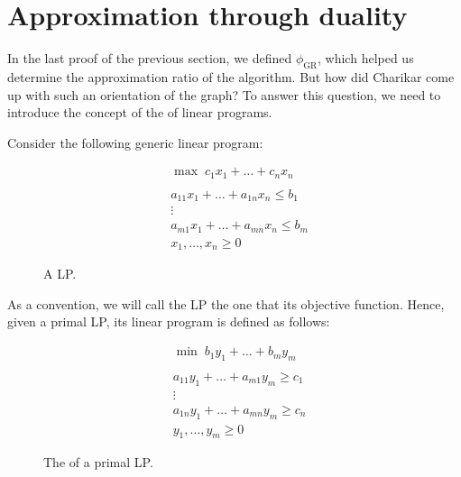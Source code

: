 \documentclass[a4paper, 12pt]{report}
\begin{document}
    \section{Approximation through duality}

    In the last proof of the previous section, we defined $\phi_\mathrm{GR}$, which helped us determine the approximation ratio of the algorithm. But how did Charikar come up with such an orientation of the graph? To answer this question, we need to introduce the concept of the  of linear programs.

    Consider the following  generic linear program:

    \begin{figure}[H]
        \centering
        \[\begin{array}{cc}
            & \max \; c_1x_1 + \ldots + c_n x_n \\\\
            & a_{11}x_1 + \ldots + a_{1n}x_n \le b_1 \\
            & \vdots \\
            & a_{m1}x_1 + \ldots + a_{mn}x_n \le b_m \\
            & x_1, \ldots, x_n \ge 0
        \end{array}\]
        \caption{A  LP.}
    \end{figure}

    As a convention, we will call the  LP the one that  its objective function. Hence, given a primal LP, its  linear program is defined as follows:

    \begin{figure}[H]
        \centering
        \[\begin{array}{cc}
            & \min \; b_1y_1 + \ldots + b_m y_m \\\\
            & a_{11}y_1 + \ldots + a_{m1}y_m \ge c_1 \\
            & \vdots \\
            & a_{1n}y_1 + \ldots + a_{mn}y_m \ge c_n \\
            & y_1, \ldots, y_m \ge 0
        \end{array}\]
        \caption{The  of a primal LP.}
    \end{figure}
\end{document}
